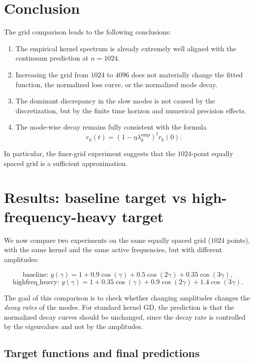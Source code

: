 \documentclass[11pt]{article}
\begin{document}
\section*{Conclusion}

The grid comparison leads to the following conclusions:
\begin{enumerate}
	\item The empirical kernel spectrum is already extremely well aligned with the continuum prediction at $n=1024$.
	\item Increasing the grid from $1024$ to $4096$ does not materially change the fitted function, the normalized loss curve, or the normalized mode decay.
	\item The dominant discrepancy in the slow modes is not caused by the discretization, but by the finite time horizon and numerical precision effects.
	\item The mode-wise decay remains fully consistent with the formula
	      \[
		      r_k(t) = (1-\eta\lambda_k^{\mathrm{emp}})^t r_k(0).
	      \]
\end{enumerate}

In particular, the finer-grid experiment suggests that the $1024$-point equally spaced grid is a sufficient approximation.

\section*{Results: baseline target vs high-frequency-heavy target}

We now compare two experiments on the same equally spaced grid ($1024$ points), with the same kernel and the same active frequencies, but with different amplitudes:

\[
	\text{baseline: }
	y(\gamma)=1+0.9\cos(\gamma)+0.5\cos(2\gamma)+0.35\cos(3\gamma),
\]
\[
	\text{highfreq\_heavy: }
	y(\gamma)=1+0.35\cos(\gamma)+0.9\cos(2\gamma)+1.4\cos(3\gamma).
\]

The goal of this comparison is to check whether changing amplitudes changes the \emph{decay rates} of the modes.
For standard kernel GD, the prediction is that the normalized decay curves should be unchanged, since the decay rate is controlled by the eigenvalues and not by the amplitudes.

\subsection*{Target functions and final predictions}
\end{document}
